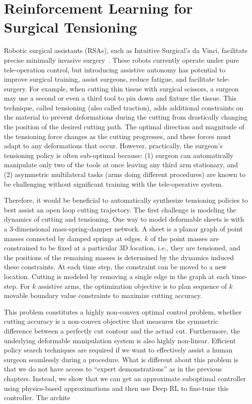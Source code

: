 \chapter{Reinforcement Learning for Surgical Tensioning}
Robotic surgical assistants (RSAs), such as Intuitive Surgical's da Vinci, facilitate precise minimally invasive surgery~\cite{veldkamp2005laparoscopic}. These robots currently operate under pure tele-operation control, but introducing assistive autonomy has potential to improve surgical training, assist surgeons, reduce fatigue, and facilitate tele-surgery.
For example, when cutting thin tissue with surgical scissors, a surgeon may use a second or even a third tool to pin down and fixture the tissue.
This technique, called tensioning (also called traction), adds additional constraints on the material to prevent deformations during the cutting from drastically changing the position of the desired cutting path.
The optimal direction and magnitude of the tensioning force changes as the cutting progresses, and these forces must adapt to any deformations that occur. 
However, practically, the surgeon's tensioning policy is often sub-optimal because: (1) surgeon can automatically manipulate only two of the tools at once leaving any third arm stationary, and (2) asymmetric multilateral tasks (arms doing different procedures) are known to be challenging without significant training with the tele-operative system.

Therefore, it would be beneficial to automatically synthesize tensioning policies to best assist an open loop cutting trajectory. The first challenge is modeling the dynamics of cutting and tensioning. One way to model deformable sheets is with a 3-dimensional mass-spring-damper network. A sheet is a planar graph of point masses connected by damped springs at edges. $k$ of the point masses are constrained to be fixed at a particular 3D location, i.e., they are tensioned, and the positions of the remaining masses is determined by the dynamics induced these constraints. At each time step, the constraint can be moved to a new location. Cutting is modeled by removing a single edge in the graph at each time-step.  For $k$ assistive arms, the optimization objective is to plan  sequence of $k$ movable boundary value constraints to maximize cutting accuracy.

This problem constitutes a highly non-convex optimal control problem, whether cutting accuracy is a non-convex objective that measures the symmetric difference between a perfectly cut contour and the actual cut. Furthermore, the underlying deformable manipulation system is also highly non-linear. 
Efficient policy search techniques are required if we want to effectively assist a human surgeon seamlessly during a procedure.
What is different about this problem is that we do not have access to ``expert demonstrations'' as in the previous chapters. 
Instead, we show that we can get an approximate suboptimal controller using physics-based approximations and then use Deep RL to fine-tune this controller. 
The archite


